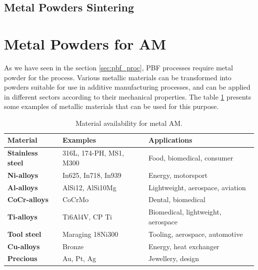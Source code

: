 \subsection{Metal Powders Sintering}
\section{Metal Powders for AM} \label{sec:metalpowders}
As we have seen in the section \ref{sec:pbf_proc}, PBF processes require metal powder for the process. Various metallic materials can be transformed into powders suitable for use in additive manufacturing processes, and can be applied in different sectors according to their mechanical properties. The table \ref{table:materialAMmetal} presents some examples of metallic materials that can be used for this purpose. 

\begin{table}[H]
\centering 
    \begin{tabular}{|l l l|}
    \hline
     \textbf{Material} & \textbf{Examples} & \textbf{Applications}\\
    \hline \hline
    \textbf{Stainless steel} & 316L, 174-PH, MS1, M300 & Food, biomedical, consumer \T\B\\
    \hline
    \textbf{Ni-alloys} & In625, In718, In939 & Energy, motorsport\T\B\\
    \hline
    
    \textbf{Al-alloys} & AlSi12, AlSi10Mg & Lightweight, aerospace, aviation\T\B\\
    \hline

    \textbf{CoCr-alloys} & CoCrMo & Dental, biomedical\T\B\\
    \hline

    \textbf{Ti-alloys} & Ti6Al4V, CP Ti & Biomedical, lightweight, aerospace\T\B\\
    \hline

    \textbf{Tool steel} & Maraging 18Ni300 & Tooling, aerospace, automotive\T\B\\
    \hline

    \textbf{Cu-alloys} & Bronze & Energy, heat exchanger\T\B\\
    \hline

    \textbf{Precious} & Au, Pt, Ag & Jewellery, design\T\B\\
    \hline
    
    \end{tabular}
    \\[10pt]
    \caption{Material availability for metal AM.}
    \label{table:materialAMmetal}
\end{table}





